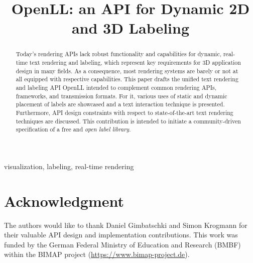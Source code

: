\documentclass[10pt, conference, compsocconf]{IEEEtran}
\begin{document}
\title{OpenLL: an API for Dynamic 2D and 3D Labeling}

\author{
\and
{}
}

\maketitle

\begin{abstract}
  Today's rendering APIs lack robust functionality and capabilities for dynamic, real-time text rendering and labeling, which represent key requirements for 3D application design in many fields.
  As a consequence, most rendering systems are barely or not at all equipped with respective capabilities.
  This paper drafts the unified text rendering and labeling API OpenLL intended to complement common rendering APIs, frameworks, and transmission formats.
  For it, various uses of static and dynamic placement of labels are showcased and a text interaction technique is presented.
  Furthermore, API design constraints with respect to state-of-the-art text rendering techniques are discussed.
  This contribution is intended to initiate a community-driven specification of a free and \emph{open label library}.
\end{abstract}

\begin{IEEEkeywords}
visualization, labeling, real-time rendering
\end{IEEEkeywords}

\IEEEpeerreviewmaketitle





 


\section*{Acknowledgment}
\noindent
The authors would like to thank Daniel Gimbatschki and Simon Krogmann for their valuable API design and implementation contributions.
This work was funded by the German Federal Ministry of Education and Research (BMBF) within the BIMAP project (\url{https://www.bimap-project.de}).


  
\end{document}
